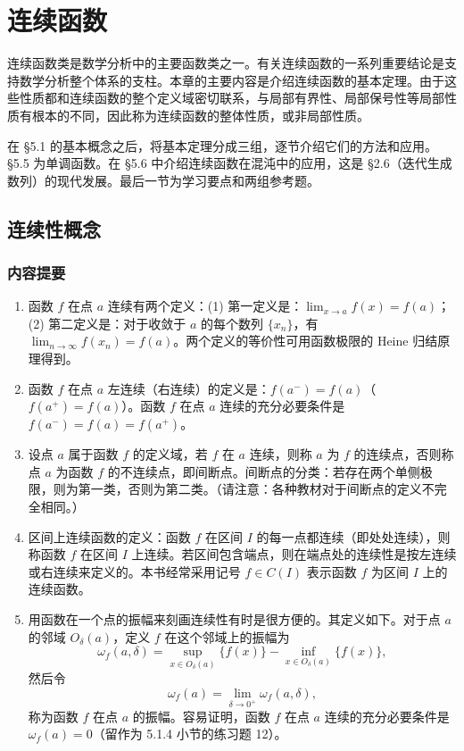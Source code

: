 \chapter{连续函数}


连续函数类是数学分析中的主要函数类之一。有关连续函数的一系列重要结论是支持数学分析整个体系的支柱。本章的主要内容是介绍连续函数的基本定理。由于这些性质都和连续函数的整个定义域密切联系，与局部有界性、局部保号性等局部性质有根本的不同，因此称为连续函数的整体性质，或非局部性质。

在 §5.1 的基本概念之后，将基本定理分成三组，逐节介绍它们的方法和应用。§5.5 为单调函数。在 §5.6 中介绍连续函数在混沌中的应用，这是 §2.6（迭代生成数列）的现代发展。最后一节为学习要点和两组参考题。

\section{连续性概念}

\subsection{内容提要}

\begin{enumerate}
  \item 函数 $f$ 在点 $a$ 连续有两个定义：(1) 第一定义是：$\lim_{x\to a}f(x)=f(a)$；(2) 第二定义是：对于收敛于 $a$ 的每个数列 $\{x_n\}$，有 $\lim_{n\to\infty}f(x_n)=f(a)$。两个定义的等价性可用函数极限的 Heine 归结原理得到。
  \item 函数 $f$ 在点 $a$ 左连续（右连续）的定义是：$f(a^-)=f(a)$（$f(a^+)=f(a)$）。函数 $f$ 在点 $a$ 连续的充分必要条件是 $f(a^-)=f(a)=f(a^+)$。
  \item 设点 $a$ 属于函数 $f$ 的定义域，若 $f$ 在 $a$ 连续，则称 $a$ 为 $f$ 的连续点，否则称点 $a$ 为函数 $f$ 的不连续点，即间断点。间断点的分类：若存在两个单侧极限，则为第一类，否则为第二类。（请注意：各种教材对于间断点的定义不完全相同。）
  \item 区间上连续函数的定义：函数 $f$ 在区间 $I$ 的每一点都连续（即处处连续），则称函数 $f$ 在区间 $I$ 上连续。若区间包含端点，则在端点处的连续性是按左连续或右连续来定义的。本书经常采用记号 $f\in C(I)$ 表示函数 $f$ 为区间 $I$ 上的连续函数。
  \item 用函数在一个点的振幅来刻画连续性有时是很方便的。其定义如下。对于点 $a$ 的邻域 $O_\delta(a)$，定义 $f$ 在这个邻域上的振幅为
  \[
    \omega_f(a,\delta)=\sup_{x\in O_\delta(a)}\{f(x)\}-\inf_{x\in O_\delta(a)}\{f(x)\},
  \]
  然后令
  \[
    \omega_f(a)=\lim_{\delta\to0^+}\omega_f(a,\delta),
  \]
  称为函数 $f$ 在点 $a$ 的振幅。容易证明，函数 $f$ 在点 $a$ 连续的充分必要条件是 $\omega_f(a)=0$（留作为 5.1.4 小节的练习题 12）。
\end{enumerate}

